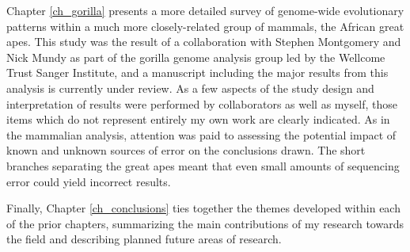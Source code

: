 Chapter \ref{ch_gorilla} presents a more detailed survey of
genome-wide evolutionary patterns within a much more closely-related
group of mammals, the African great apes. This study was the result of
a collaboration with Stephen Montgomery and Nick Mundy as part of the
gorilla genome analysis group led by the Wellcome Trust Sanger
Institute, and a manuscript including the major results from this
analysis is currently under review. As a few aspects of the study
design and interpretation of results were performed by collaborators
as well as myself, those items which do not represent entirely my own
work are clearly indicated. As in the mammalian analysis, attention
was paid to assessing the potential impact of known and unknown
sources of error on the conclusions drawn. The short branches
separating the great apes meant that even small amounts of sequencing
error could yield incorrect results.

Finally, Chapter \ref{ch_conclusions} ties together the themes
developed within each of the prior chapters, summarizing the main
contributions of my research towards the field and describing planned
future areas of research.
